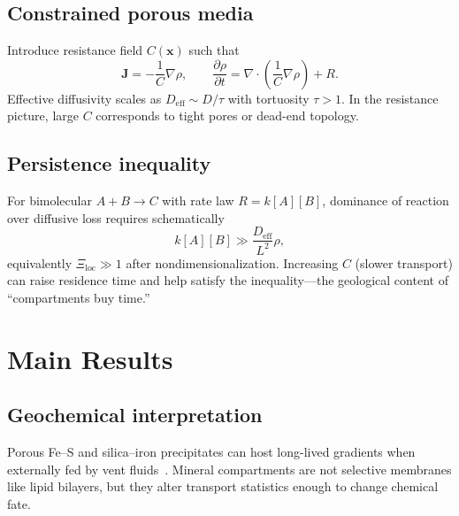 \documentclass[11pt,a4paper]{article}
\begin{document}
\subsection{Constrained porous media}
Introduce resistance field $C(\bm{x})$ such that
\begin{equation}
\bm{J} = -\frac{1}{C}\nabla\rho,\qquad
\frac{\partial \rho}{\partial t} = \nabla\cdot\left(\frac{1}{C}\nabla\rho\right) + R.
\end{equation}
Effective diffusivity scales as $D_{\mathrm{eff}}\sim D/\tau$ with tortuosity $\tau>1$. In the resistance picture, large $C$ corresponds to tight pores or dead-end topology.

\subsection{Persistence inequality}
For bimolecular $A+B\rightarrow C$ with rate law $R=k[A][B]$, dominance of reaction over diffusive loss requires schematically
\begin{equation}
k[A][B] \gg \frac{D_{\mathrm{eff}}}{L^2}\rho,
\end{equation}
equivalently $\Xi_{\mathrm{loc}}\gg 1$ after nondimensionalization. Increasing $C$ (slower transport) can raise residence time and help satisfy the inequality---the geological content of ``compartments buy time.''

\section{Main Results}

\subsection{Geochemical interpretation}
Porous Fe--S and silica--iron precipitates can host long-lived gradients when externally fed by vent fluids~\cite{Martin2007}. Mineral compartments are not selective membranes like lipid bilayers, but they alter transport statistics enough to change chemical fate.
\end{document}
